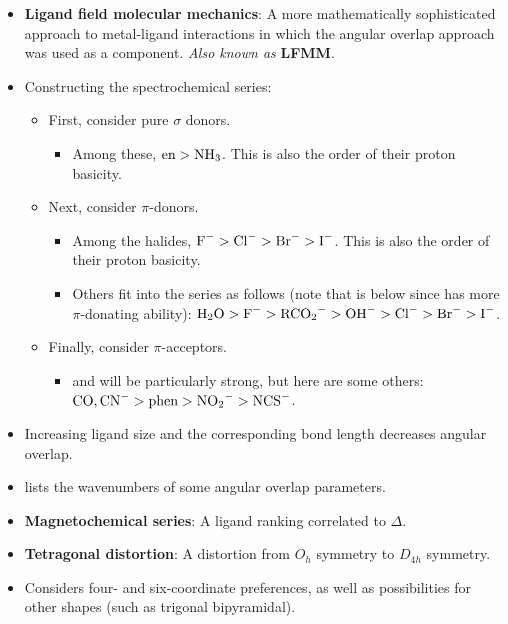 \documentclass[../notes.tex]{subfiles}
\begin{document}
\begin{itemize}
\begin{itemize}
    \end{itemize}
    \item \textbf{Ligand field molecular mechanics}: A more mathematically sophisticated approach to metal-ligand interactions in which the angular overlap approach was used as a component. \emph{Also known as} \textbf{LFMM}.
    \item Constructing the spectrochemical series:
    \begin{itemize}
        \item First, consider pure $\sigma$ donors.
        \begin{itemize}
            \item Among these, $\text{en}>\ce{NH3}$. This is also the order of their proton basicity.
        \end{itemize}
        \item Next, consider $\pi$-donors.
        \begin{itemize}
            \item Among the halides, $\ce{F-}>\ce{Cl-}>\ce{Br-}>\ce{I-}$. This is also the order of their proton basicity.
            \item Others fit into the series as follows (note that  is below  since  has more $\pi$-donating ability): $\ce{H2O}>\ce{F-}>\ce{RCO2-}>\ce{OH-}>\ce{Cl-}>\ce{Br-}>\ce{I-}$.
        \end{itemize}
        \item Finally, consider $\pi$-acceptors.
        \begin{itemize}
            \item {} and  will be particularly strong, but here are some others: $\ce{CO},\ce{CN-}>\text{phen}>\ce{NO2-}>\ce{NCS-}$.
        \end{itemize}
    \end{itemize}
    \item Increasing ligand size and the corresponding bond length decreases angular overlap.
    \item \textcite{bib:MiesslerFischerTarr} lists the wavenumbers of some angular overlap parameters.
    \item \textbf{Magnetochemical series}: A ligand ranking correlated to $\Delta$.
    \item \textbf{Tetragonal distortion}: A distortion from $O_h$ symmetry to $D_{4h}$ symmetry.
    \item Considers four- and six-coordinate preferences, as well as possibilities for other shapes (such as trigonal bipyramidal).

\end{itemize}
\end{document}
